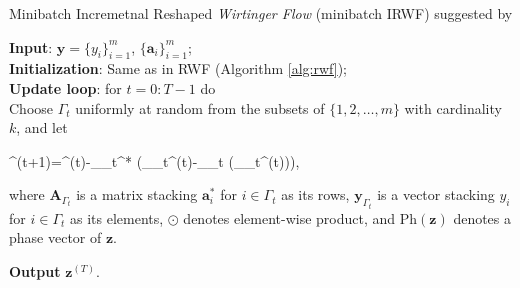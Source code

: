 		\begin{algorithm}[th]
			\caption{Minibatch Incremetnal Reshaped \emph{Wirtinger Flow} (minibatch IRWF) suggested by \cite{bib:rfw-irwf}}\label{alg:mbirwf}
			
			\textbf{Input}: $\boldsymbol{y}=\{y_i\}_{i=1}^m$, $\{\boldsymbol{a}_i\}_{i=1}^m$; \\
			\textbf{Initialization}: Same as in RWF (Algorithm \ref{alg:rwf}); \\
			
			 \textbf{Update loop}: for $t=0:T-1$ do\\
			 Choose $\Gamma_t$ uniformly at random from the subsets of  $\{1,2,\ldots, m\}$ with cardinality $k$, and let
			 \begin{flalign}
				\boldsymbol{z}^{(t+1)}=^{(t)}-\mu\cdot{}_{\Gamma_t}^* \left(_{\Gamma_t}^{(t)}-_{\Gamma_t}\odot{} (_{\Gamma_t}^{(t)})\right), \label{eq:mbirwfUpdate}
			\end{flalign}
			where $\boldsymbol{A}_{\Gamma_t}$ is a matrix stacking $\boldsymbol{a}_i^*$ for $i\in \Gamma_t$ as its rows,  $\boldsymbol{y}_{\Gamma_t}$ is a vector stacking $y_i$ for $i\in \Gamma_t$ as its elements, $\odot$ denotes element-wise product, and $\text{Ph}(\boldsymbol{z})$ denotes a phase vector of $\boldsymbol{z}$.%
			
			\textbf{Output} $\boldsymbol{z}^{(T)}$.
			\end{algorithm}


			